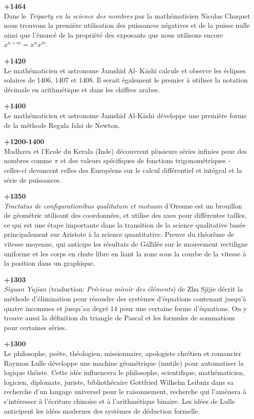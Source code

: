 \textbf{+1464}\\
Dans le \textit{Triparty en la science des nombres} par la mathématicien Nicolas Chuquet nous trouvons la première utilisation des puissances négatives et de la puisse nulle ainsi que l'énoncé de la propriété des exposants que nous utilisons encore $x^{n + m} = x^n x^m$.

\textbf{+1420}\\
Le mathématicien et astronome Jamshīd Al- Kāshī calcule et observe les éclipses solaires de 1406, 1407 et 1408. Il serait également le premier à utiliser la notation décimale en arithmétique et dans les chiffres arabes.

\textbf{+1400}\\
Le mathématicien et astronome Jamshīd Al-Kāshī développe une première forme de la méthode Regula falsi de Newton.

\textbf{+1200-1400}\\
Madhava et l'Ecole du Kerala (Inde) découvrent plusieurs séries infinies pour des nombres comme $\pi$ et des valeurs spécifiques de fonctions trigonométriques - celles-ci devancent celles des Européens sur le calcul différentiel et intégral et la série de puissances.

\textbf{+1350}\\
\textit{Tractatus de configurationibus qualitatum et motuum} d'Oresme est un brouillon de géométrie utilisant des coordonnées, et utilise des axes pour différentes tailles, ce qui est une étape importante dans la transition de la science qualitative basée principalement sur Aristote à la science quantitative. Preuve du théorème de vitesse moyenne, qui anticipe les résultats de Gallilée sur le mouvement rectiligne uniforme et les corps en chute libre en liant la zone sous la courbe de la vitesse à la position dans un graphique.

\textbf{+1303}\\
\textit{Siyuan Yujian} (traduction: \textit{Précieux miroir des éléments}) de Zhu Sjijie décrit la méthode d'élimination pour résoudre des systèmes d'équations contenant jusqu'à quatre inconnues et jusqu'au degré $14$ pour une certaine forme d'équations. On y trouve aussi la définition du triangle de Pascal et les formules de sommations pour certaines séries.

\textbf{+1300}\\
Le philosophe, poète, théologien, missionnaire, apologiste chrétien et romancier Raymon Lulle développe une machine géométrique (inutile) pour automatiser la logique théiste. Cette idée influencera le  philosophe, scientifique, mathématicien, logicien, diplomate, juriste, bibliothécaire Gottfried Wilhelm Leibniz dans sa recherche d'un langage universel pour le raisonnement, recherche qui l'amènera à s'intéresser à l'écriture chinoise et à l'arithmétique binaire. Les idées de Lulle anticipent les idées modernes des systèmes de déduction formelle.

